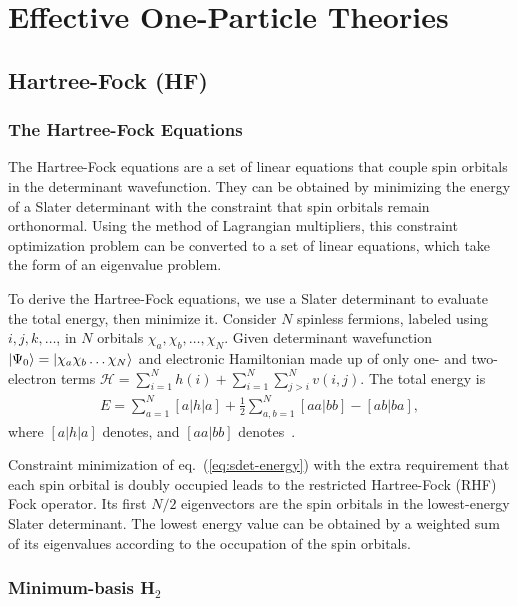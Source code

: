 \section{Effective One-Particle Theories}
\subsection{Hartree-Fock (HF)}

\newcommand{\hcore}{H^{\text{core}}_{\mu\nu}}
\newcommand{\ksveff}{V^{\text{eff}}_{\mu\nu}}

\subsubsection{The Hartree-Fock Equations}
The Hartree-Fock equations are a set of linear equations that couple spin orbitals in the determinant wavefunction. They can be obtained by minimizing the energy of a Slater determinant with the constraint that spin orbitals remain orthonormal. Using the method of Lagrangian multipliers, this constraint optimization problem can be converted to a set of linear equations, which take the form of an eigenvalue problem.

To derive the Hartree-Fock equations, we use a Slater determinant to evaluate the total energy, then minimize it. Consider $N$ spinless fermions, labeled using $i,j,k,\dots$, in $N$ orbitals $\chi_a,\chi_b,\dots,\chi_N$. Given determinant wavefunction $\ket{\Psi_0}=\ket{\chi_a\chi_b\dots\chi_N}$ and electronic Hamiltonian made up of only one- and two-electron terms $\mathcal{H}=\sum\limits_{i=1}^N h(i) + \sum\limits_{i=1}^N\sum\limits_{j>i}^N v(i,j)$. The total energy is
\begin{align} \label{eq:sdet-energy}
E= \sum\limits_{a=1}^N [a|h|a] + \frac{1}{2}\sum\limits_{a,b=1}^N [aa|bb] - [ab|ba],
\end{align}
where $[a|h|a]$ denotes, and $[aa|bb]$ denotes~\cite{Szabo1996}.

Constraint minimization of eq.~(\ref{eq:sdet-energy}) with the extra requirement that each spin orbital is doubly occupied leads to the restricted Hartree-Fock (RHF) Fock operator. Its first $N/2$ eigenvectors are the spin orbitals in the lowest-energy Slater determinant. The lowest energy value can be obtained by a weighted sum of its eigenvalues according to the occupation of the spin orbitals.

\subsubsection{Minimum-basis H$_2$}

